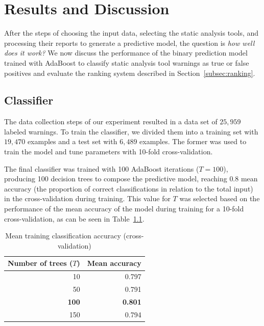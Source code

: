 \chapter{Results and Discussion}
\label{ch:results}
\FloatBarrier

After the steps of choosing the input data, selecting the static analysis
tools, and processing their reports to generate a predictive model, the question is \emph{how well does
it work?} We now
discuss the performance of the binary prediction model trained with
AdaBoost to classify static analysis tool warnings as true or false positives and
evaluate the ranking system described in Section~\ref{subsec:ranking}.

\section{Classifier}
\label{sec:results_classifier}

The data collection steps of our experiment resulted in a data set of $25,959$ labeled
warnings. To train the classifier, we divided them
into a training set with $19,470$ examples and a test set with $6,489$
examples. The former was used to train the model and tune parameters with 
10-fold cross-validation.

The final classifier was trained with 100 AdaBoost iterations ($T = 100$),
producing 100 decision trees to compose the predictive model, reaching $0.8$
mean accuracy (the proportion of correct classifications in relation to the total input)
in the cross-validation during training. This value for $T$ was
selected based on the performance of the mean accuracy of the model during training for a 10-fold
cross-validation, as can be seen in Table~\ref{tab:mean_acc}.

  \begin{table}
    \begin{center}
        \begin{tabular}{rr}\hline
          Number of trees ($T$) & Mean accuracy \\
        \hline
          10 & 0.797 \\
          50 & 0.791 \\
          \textbf{100} & \textbf{0.801} \\
          150 & 0.794 \\ \hline
        \end{tabular}
        \caption{Mean training classification accuracy (cross-validation)}\label{tab:mean_acc}
    \end{center}
\end{table}

